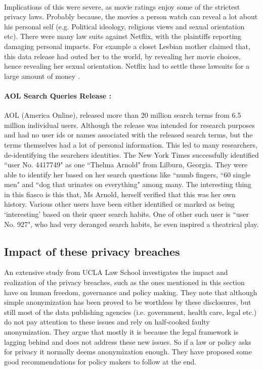 \documentclass[12pt]{report}
\theoremstyle{named}
\begin{document}
\paragraph{}
Implications of this were severe, as movie ratings enjoy some of the strictest privacy laws. Probably because, the movies a person watch can reveal a lot about his personal self (e.g. Political ideology, religious views and sexual orientation etc). There were many law suits against Netflix, with the plaintiffs reporting damaging personal impacts. For example a closet Lesbian mother claimed that, this data release had outed her to the world, by revealing her movie choices, hence revealing her sexual orientation. Netflix had to settle these lawsuits for a large amount of money \cite{netFlixSetlement}.



\paragraph{AOL Search Queries Release \cite{barbaro2006face}:\\}
AOL (America Online), released more than 20 million search terms from 6.5 million individual users. Although the release was intended for research purposes and had no user ids or names associated with the released search terms, but the terms themselves had a lot of personal information. This led to many researchers, de-identifying the searchers identities. The New York Times successfully identified ``user No. 4417749" as one ``Thelma Arnold" from Lilburn, Georgia. They were able to identify her based on her search questions like ``numb fingers, ``60 single men" and ``dog that urinates on everything" among many. The interesting thing in this fiasco is this that, Ms Arnold, herself verified that this was her own history. Various other users have been either identified or marked as being `interesting' based on their queer search habits. One of other such user is ``user No. 927", who had very deranged search habits, he even inspired a theatrical play.


\subsection{Impact of these privacy breaches}
An extensive study \cite{ohm2009broken} from  UCLA Law School investigates the impact and realization of the privacy breaches, such as the ones mentioned in this section have on human freedom, governance and policy making. They note that although simple anonymization has been proved to be worthless by these disclosures, but still most of the data publishing agencies (i.e. government, health care, legal etc.) do not pay attention to these issues and rely on half-cooked faulty anonymization. They argue that mostly it is because the legal framework is lagging behind and does not address these new issues. So if a law or policy asks for privacy it normally deems anonymization enough. They have proposed some good recommendations for policy makers to follow at the end.
\end{document}
